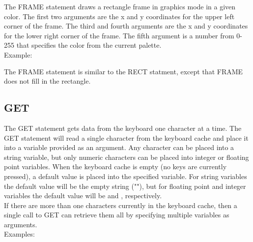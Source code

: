 The {\ttfamily FRAME} statement draws a rectangle frame in graphics mode in a
given color.  The first two arguments are the x and y coordinates for the upper
left corner of the frame.  The third and fourth arguments are the x and y
coordinates for the lower right corner of the frame.  The fifth argument is a
number from 0-255 that specifies the color from the current palette.\\

Example:\\


The {\ttfamily FRAME} statement is similar to the {\ttfamily RECT} statment,
except that {\ttfamily FRAME} does not fill in the rectangle.

\subsection{GET}

The {\ttfamily GET} statement gets data from the keyboard one character at a
time.  The {\ttfamily GET} statement will read a single character from the
keyboard cache and place it into a variable provided as an argument.  Any
character can be placed into a string variable, but only numeric characters can
be placed into integer or floating point variables.  When the keyboard cache is
empty (no keys are currently pressed), a default value is placed into the
specified variable.  For string variables the default value will be the empty
string ({\ttfamily ""}), but for floating point and integer variables the
default value will be {} and {}, respectively.\\

If there are more than one characters currently in the keyboard cache,
then a single call to {\ttfamily GET} can retrieve them all by specifying
multiple variables as arguments.\\

Examples:\\

